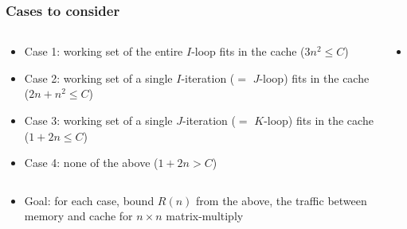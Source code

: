 \documentclass[12pt,dvipdfmx]{beamer}
\newcommand{\ao}[1]{{\color{blue}#1}}
\begin{document}
\begin{frame}[fragile]
\frametitle{Cases to consider}
\begin{columns}
  \begin{column}{0.5\textwidth}
    \begin{itemize}
    \item<2-> Case 1: working set of \ao{the entire $I$-loop} fits in the cache ($3n^2 \leq C$)
    \item<3-> Case 2: working set of \ao{a single $I$-iteration ($=$ $J$-loop)} fits in the cache
      ($2n+n^2 \leq C$)
    \item<4-> Case 3: working set of \ao{a single $J$-iteration ($=$ $K$-loop)} fits in the cache
      ($1+2n \leq C$)
    \item<5-> Case 4: none of the above ($1+2n > C$)
    \end{itemize}
  \end{column}

  \begin{column}{0.5\textwidth}
    \begin{itemize}
    \item []
    \end{itemize}
  \end{column}
\end{columns}

\begin{itemize}
  \item<6->[]
    Goal: for each case, bound $R(n)$ from the above,
    the traffic between memory and cache for $n \times n$ matrix-multiply
\end{itemize}

\end{frame}
\end{document}
